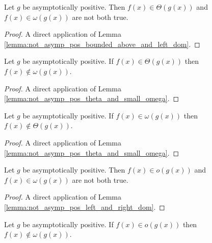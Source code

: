 \begin{lemma}
    \label{lemma:not_asymp_pos_theta_and_small_omega}
    \leanok
    Let $g$ be asymptotically positive. Then $f(x) \in \Theta(g(x))$ and 
    $f(x) \in \omega(g(x))$ are not both true.
\end{lemma}

\begin{proof}
    \leanok
    A direct application of Lemma \ref{lemma:not_asymp_pos_bounded_above_and_left_dom}.
\end{proof}

\begin{lemma}
    \label{lemma:not_asymp_pos_small_omega_of_theta}
    \leanok
    Let $g$ be asymptotically positive. If $f(x) \in \Theta(g(x))$ then $f(x) \notin \omega(g(x))$.
\end{lemma}

\begin{proof}
    \leanok
    A direct application of Lemma \ref{lemma:not_asymp_pos_theta_and_small_omega}.
\end{proof}

\begin{lemma}
    \label{lemma:not_asymp_pos_theta_of_small_omega}
    \leanok
    Let $g$ be asymptotically positive. If $f(x) \in \omega(g(x))$ then $f(x) \notin \Theta(g(x))$.
\end{lemma}

\begin{proof}
    \leanok
    A direct application of Lemma \ref{lemma:not_asymp_pos_theta_and_small_omega}.
\end{proof}

\begin{lemma}
    \label{lemma:not_asymp_pos_o_and_small_omega}
    \leanok
    Let $g$ be asymptotically positive. Then $f(x) \in o(g(x))$ and 
    $f(x) \in \omega(g(x))$ are not both true.
\end{lemma}

\begin{proof}
    \leanok
    A direct application of Lemma \ref{lemma:not_asymp_pos_left_and_right_dom}.
\end{proof}

\begin{lemma}
    \label{lemma:not_asymp_pos_small_omega_of_o}
    \leanok
    Let $g$ be asymptotically positive. If $f(x) \in o(g(x))$ then $f(x) \notin \omega(g(x))$.
\end{lemma}


